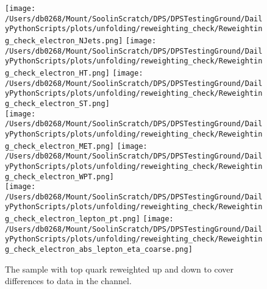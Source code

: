 \begin{figure*}[hp]
	\centering
	\texttt{[image: /Users/db0268/Mount/SoolinScratch/DPS/DPSTestingGround/DailyPythonScripts/plots/unfolding/reweighting\_check/Reweighting\_check\_electron\_NJets.png]}
	\texttt{[image: /Users/db0268/Mount/SoolinScratch/DPS/DPSTestingGround/DailyPythonScripts/plots/unfolding/reweighting\_check/Reweighting\_check\_electron\_HT.png]}
	\texttt{[image: /Users/db0268/Mount/SoolinScratch/DPS/DPSTestingGround/DailyPythonScripts/plots/unfolding/reweighting\_check/Reweighting\_check\_electron\_ST.png]} \\
	\texttt{[image: /Users/db0268/Mount/SoolinScratch/DPS/DPSTestingGround/DailyPythonScripts/plots/unfolding/reweighting\_check/Reweighting\_check\_electron\_MET.png]} 
	\texttt{[image: /Users/db0268/Mount/SoolinScratch/DPS/DPSTestingGround/DailyPythonScripts/plots/unfolding/reweighting\_check/Reweighting\_check\_electron\_WPT.png]} \\
	\texttt{[image: /Users/db0268/Mount/SoolinScratch/DPS/DPSTestingGround/DailyPythonScripts/plots/unfolding/reweighting\_check/Reweighting\_check\_electron\_lepton\_pt.png]}
	\texttt{[image: /Users/db0268/Mount/SoolinScratch/DPS/DPSTestingGround/DailyPythonScripts/plots/unfolding/reweighting\_check/Reweighting\_check\_electron\_abs\_lepton\_eta\_coarse.png]} 
	\caption[The \powhegpythia{} sample with top quark \pt{} reweighted up and down to cover differences to data in the \eJets{} channel.]{The \powhegpythia{} sample with top quark \pt{} reweighted up and down to cover differences to data in the \eJets{} channel.}
	\label{fig:Reweightingse}
\end{figure*}

